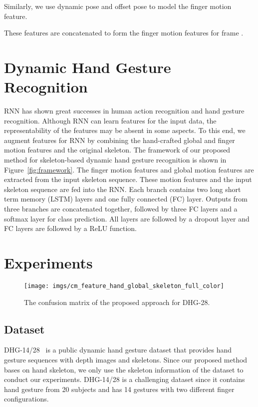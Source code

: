 \documentclass{article}
\begin{document}
Similarly, we use dynamic pose  and offset pose  to model the finger motion feature.


These features are concatenated to form the finger motion features  for frame .

\section{Dynamic Hand Gesture Recognition}
\label{sec:dhgr}

RNN has shown great successes in human action recognition and hand gesture recognition. Although RNN can learn features for the input data, the representability of the features may be absent in some aspects. To this end, we augment features for RNN by combining the hand-crafted global and finger motion features and the original skeleton. The framework of our proposed method for skeleton-based dynamic hand gesture recognition is shown in Figure~\ref{fig:framework}. The finger motion features and global motion features are extracted from the input skeleton sequence. These motion features and the input skeleton sequence are fed into the RNN. Each branch contains two long short term memory (LSTM) layers and one fully connected (FC) layer. Outputs from three branches are concatenated together, followed by three FC layers and a softmax layer for class prediction. All layers are followed by a dropout layer and FC layers are followed by a ReLU function.


\section{Experiments}
\label{sec:exp}
\begin{figure*}[htb]
  \centering
  \centerline{\texttt{[image: imgs/cm\_feature\_hand\_global\_skeleton\_full\_color]}}
\caption{The confusion matrix of the proposed approach for DHG-28.}
\label{fig:res28}
\end{figure*}
\subsection{Dataset}
\label{ssec:dataset}

DHG-14/28~\cite{de2016skeleton} is a public dynamic hand gesture dataset that provides hand gesture sequences with depth images and skeletons. Since our proposed method bases on hand skeleton, we only use the skeleton information of the dataset to conduct our experiments. DHG-14/28 is a challenging dataset since it contains hand gesture from 20 subjects and has 14 gestures with two different finger configurations.
\end{document}
